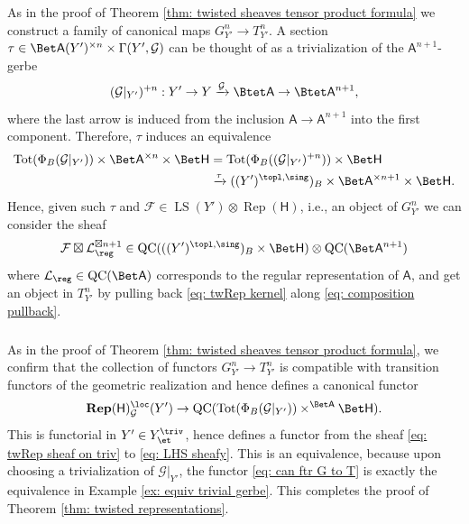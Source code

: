 \documentclass[10pt]{amsart}
\newcommand{\sssec}{\subsubsection}
\theoremstyle{remark}
\newcommand{\on}{\operatorname}
\newcommand{\cF}{\mathcal{F}}
\newcommand{\cG}{\mathcal{G}}
\newcommand{\cL}{\mathcal{L}}
\newcommand{\Rep}{\on{Rep}}
\newcommand{\QC}{\on{QC}}
\newcommand{\LS}{\on{LS}}
\newcommand{\Tot}{\on{Tot}}
\newcommand{\sfA}{\mathsf{A}}
\begin{document}
\sssec{}
As in the proof of Theorem \ref{thm: twisted sheaves tensor product formula} we construct a family of canonical maps $G^n_{Y'}\rightarrow T^n_{Y'}$. A section $\tau\in \Bet \sfA(Y')^{\times n}\times \Gamma(Y',\cG)$ can be thought of as a trivialization of the $\sfA^{n+1}$-gerbe
\[(\cG|_{Y'})^{+n}: Y'\rightarrow Y\xrightarrow{\cG} \Btet \sfA\rightarrow \Btet\sfA^{n+1},\]
where the last arrow is induced from the inclusion $\sfA\rightarrow\sfA^{n+1}$ into the first component.  Therefore, $\tau$ induces an equivalence
\begin{align}\label{eq: composition pullback}
\Tot(\Phi_B(\cG|_{Y'}))\times \Bet \sfA^{\times n}\times \Bet \mathsf{H} &= \Tot(\Phi_B((\cG|_{Y'})^{+n}))\times \Bet \mathsf{H}\\
& \xrightarrow{\tau} ((Y')^{\topl,\sing})_B\times \Bet \sfA^{\times n+1}\times \Bet \mathsf{H}.\nonumber
\end{align}
Hence, given such $\tau$ and $\cF\in\LS(Y')\otimes\Rep(\mathsf{H})$, i.e., an object of $G^n_{Y'}$ we can consider the sheaf 
\begin{equation}\label{eq: twRep kernel}
    \cF\boxtimes \cL_{\reg}^{\boxtimes n+1}\in \QC(((Y')^{\topl,\sing})_B\times \Bet \mathsf{H})\otimes \QC(\Bet \sfA^{n+1})
\end{equation}
where $\cL_{\reg}\in\QC(\Bet \sfA)$ corresponds to the regular representation of $\sfA$, and get an object in $T^n_{Y'}$ by pulling back \eqref{eq: twRep kernel} along \eqref{eq: composition pullback}.



\sssec{}
As in the proof of Theorem \ref{thm: twisted sheaves tensor product formula}, we confirm that the collection of functors $G^n_{Y'}\rightarrow T^n_{Y'}$ is compatible with transition functors of the geometric realization and hence defines a canonical functor
\begin{equation}\label{eq: can ftr G to T}
    \mathbf{Rep}(\mathsf{H})^{\loc}_{\cG}(Y')\rightarrow \QC(\Tot(\Phi_B(\cG|_{Y'}))\times^{\Bet \sfA} \Bet \mathsf{H}).
\end{equation}
This is functorial in $Y'\in Y^{\triv}_{\et}$, hence defines a functor from the sheaf \eqref{eq: twRep sheaf on triv} to \eqref{eq: LHS sheafy}. This is an equivalence, because upon choosing a trivialization of $\cG|_{Y'}$, the functor \eqref{eq: can ftr G to T} is exactly the equivalence in Example \ref{ex: equiv trivial gerbe}. This completes the proof of Theorem \ref{thm: twisted representations}.
\end{document}
